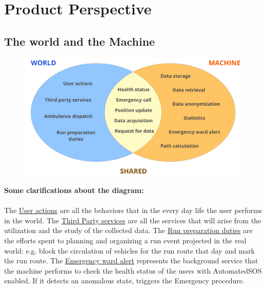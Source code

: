 \section{Product Perspective}
\subsection{The world and the Machine}
\begin{figure}[H]
    \centering
    \includegraphics[scale=0.3]{rasdL/Pictures/worldmachine.png}

\end{figure}

\textbf{Some clarifications about the diagram:}\\ \\
The \underline{User actions} are all the behaviors that in the every day life the user performs in the world. The \underline{Third Party services} are all the services that will arise from the utilization and the study of the collected data. The \underline{Run preparation duties} are the efforts spent to planning and organizing a run event projected in the real world: e.g. block the circulation of vehicles for the run route that day and mark the run route. The \underline{Emergency ward alert} represents the background service that the machine performs to check the health status
of the users with AutomatedSOS enabled. If it detects an anomalous state, triggers the Emergency procedure.

\newpage
